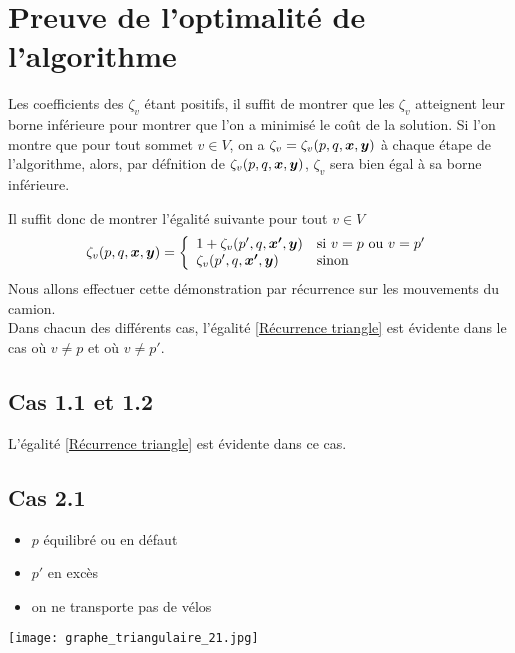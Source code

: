 \section{Preuve de l'optimalité de l'algorithme}

Les coefficients des $\zeta_v$ étant positifs, il suffit de montrer que les $\zeta_v$ atteignent leur borne inférieure pour montrer que l'on a minimisé le coût de la solution. Si l'on montre que pour tout sommet $v \in V$, on a $\zeta_v = \zeta_v(p,q,\boldsymbol{x},\boldsymbol{y})$ à chaque étape de l'algorithme, alors, par défnition de $\zeta_v(p,q,\boldsymbol{x},\boldsymbol{y})$,  $\zeta_v$ sera bien égal à sa borne inférieure.

Il suffit donc de montrer l'égalité suivante pour tout $v \in V$
\begin{gather} \label{Récurrence triangle}
  \zeta_v(p,q,\boldsymbol{x},\boldsymbol{y}) = \left\{
  \begin{array}{ll}
    1+\zeta_v(p',q,\boldsymbol{x'},\boldsymbol{y}) & \mbox{si } v=p \mbox{ ou } v=p' \\
    \zeta_v(p',q,\boldsymbol{x'},\boldsymbol{y}) & \mbox{sinon}
  \end{array}
  \right.
\end{gather}
Nous allons effectuer cette démonstration par récurrence sur les mouvements du camion.
\\

Dans chacun des différents cas, l'égalité \eqref{Récurrence triangle} est évidente dans le cas où $v \ne p$ et où $v \ne p'$.

\subsection*{Cas 1.1 et 1.2}

L'égalité \eqref{Récurrence triangle} est évidente dans ce cas.

\subsection*{Cas 2.1}

\begin{minipage}{0.5\linewidth}
\begin{itemize}
\item $p$ équilibré ou en défaut
\item $p'$ en excès
\item on ne transporte pas de vélos
\end{itemize}
\end{minipage}
\begin{minipage}{0.5\linewidth}
\begin{center}
\texttt{[image: graphe\_triangulaire\_21.jpg]}
\end{center}
\end{minipage}


